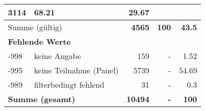 \begin{longtable}{lXrrr}
       \num{3114} &
       \num[round-mode=places,round-precision=2]{68,21} &
         \num[round-mode=places,round-precision=2]{29,67} \\
     \midrule
     \multicolumn{2}{l}{Summe (gültig)} &
       \textbf{\num{4565}} &
     \textbf{100} &
       \textbf{\num[round-mode=places,round-precision=2]{43,5}} \\
     \multicolumn{5}{l}{\textbf{Fehlende Werte}}\\
       -998 &
       keine Angabe &
         \num{159} &
        - &
         \num[round-mode=places,round-precision=2]{1,52} \\
       -995 &
       keine Teilnahme (Panel) &
         \num{5739} &
        - &
         \num[round-mode=places,round-precision=2]{54,69} \\
       -989 &
       filterbedingt fehlend &
         \num{31} &
        - &
         \num[round-mode=places,round-precision=2]{0,3} \\
     \midrule
     \multicolumn{2}{l}{\textbf{Summe (gesamt)}} &
          \textbf{\num{10494}} &
        \textbf{-} &
        \textbf{100} \\
     \bottomrule
     \end{longtable}
     
